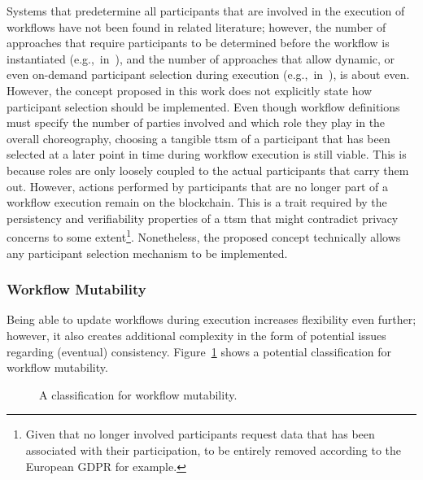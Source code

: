 Systems that predetermine all participants that are involved in the execution of workflows have not been found in related literature; however, the number of approaches that require participants to be determined before the workflow is instantiated (e.g.,\ in~\cite{modeling_blockchain_based_choreographies,inter_organizational_bps_managed_by_blockchain}), and the number of approaches that allow dynamic, or even on-demand participant selection during execution (e.g.,\ in~\cite{data_driven_choreography_data_reusability_lichtenstein,runtime_verification_for_bp_utilizing_bitcoin}), is about even. However, the concept proposed in this work does not explicitly state how participant selection should be implemented. Even though workflow definitions must specify the number of parties involved and which role they play in the overall choreography, choosing a tangible \gls{ttsm} of a participant that has been selected at a later point in time during workflow execution is still viable. This is because roles are only loosely coupled to the actual participants that carry them out. However, actions performed by participants that are no longer part of a workflow execution remain on the blockchain. This is a trait required by the persistency and verifiability properties of a \gls{ttsm} that might contradict privacy concerns to some extent\footnote{Given that no longer involved participants request data that has been associated with their participation, to be entirely removed according to the European GDPR for example.}. Nonetheless, the proposed concept technically allows any participant selection mechanism to be implemented.

\subsubsection{Workflow Mutability}
\label{sec:evaluation:qualitative_analysis:flexibility_criteria:workflow_mutability}
Being able to update workflows during execution increases flexibility even further; however, it also creates additional complexity in the form of potential issues regarding (eventual) consistency. Figure~\ref{fig:evaluation:qualitative_analysis:workflow_mutability_classes} shows a potential classification for workflow mutability.

\begin{figure}[h]
    \caption{A classification for workflow mutability.}
    \label{fig:evaluation:qualitative_analysis:workflow_mutability_classes}
\end{figure}


